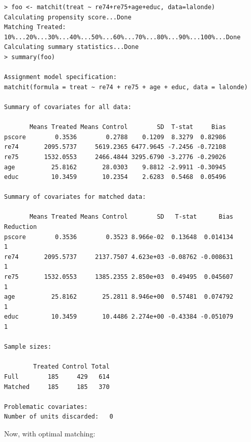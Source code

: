 \documentclass[oneside,letterpaper,titlepage]{article}
\begin{document}
\begin{verbatim}
> foo <- matchit(treat ~ re74+re75+age+educ, data=lalonde)
Calculating propensity score...Done
Matching Treated: 10%...20%...30%...40%...50%...60%...70%...80%...90%...100%...Done
Calculating summary statistics...Done
> summary(foo)

Assignment model specification:
matchit(formula = treat ~ re74 + re75 + age + educ, data = lalonde)

Summary of covariates for all data:

       Means Treated Means Control        SD  T-stat     Bias
pscore        0.3536        0.2788    0.1209  8.3279  0.82986
re74       2095.5737     5619.2365 6477.9645 -7.2456 -0.72108
re75       1532.0553     2466.4844 3295.6790 -3.2776 -0.29026
age          25.8162       28.0303    9.8812 -2.9911 -0.30945
educ         10.3459       10.2354    2.6283  0.5468  0.05496

Summary of covariates for matched data:

       Means Treated Means Control        SD   T-stat      Bias Reduction
pscore        0.3536        0.3523 8.966e-02  0.13648  0.014134         1
re74       2095.5737     2137.7507 4.623e+03 -0.08762 -0.008631         1
re75       1532.0553     1385.2355 2.850e+03  0.49495  0.045607         1
age          25.8162       25.2811 8.946e+00  0.57481  0.074792         1
educ         10.3459       10.4486 2.274e+00 -0.43384 -0.051079         1

Sample sizes:

        Treated Control Total
Full        185     429   614
Matched     185     185   370

Problematic covariates:  
Number of units discarded:   0
\end{verbatim}

Now, with optimal matching:
\end{document}
